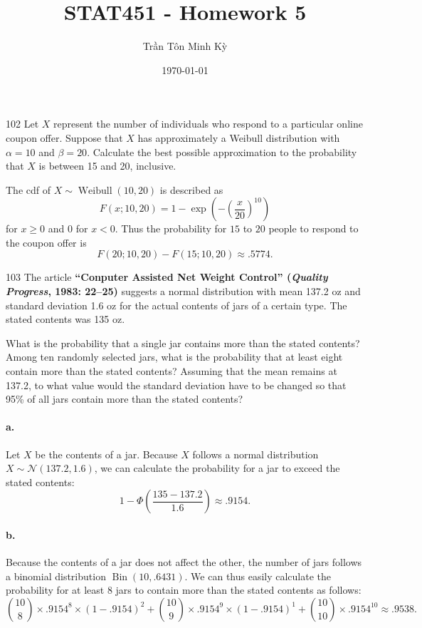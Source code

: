 \documentclass{exam}
\title{STAT451 - Homework 5}
\author{\foreignlanguage{vietnamese}{Trần Tôn Minh Kỳ}}
\date{\today}
\newcommand{\paren}[1]{\left(#1\right)}
\DeclareMathOperator{\Bin}{Bin}
\DeclareMathOperator{\Weibull}{Weibull}
\begin{document}
\maketitle
\begin{problem}{102}
	Let $X$ represent the number of individuals who respond to a particular online coupon offer. Suppose that $X$ has approximately a Weibull distribution with $\alpha = 10$ and $\beta = 20$. Calculate the best possible approximation to the probability that $X$ is between 15 and 20, inclusive.
\end{problem}

The cdf of $X \sim \Weibull(10, 20)$ is described as
\[
	F(x; 10, 20) = 1 - \exp(-\paren{\frac{x}{20}}^{10})
\]
for $x \ge 0$ and $0$ for $x < 0$. Thus the probability for $15$ to $20$ people to respond to the coupon offer is
\[
	F(20; 10, 20) - F(15; 10, 20) \approx .5774.
\]

\begin{problem}{103}
	The article \textbf{``Conputer Assisted Net Weight Control'' (\textit{Quality Progress}, 1983: 22--25)} suggests a normal distribution with mean 137.2 oz and standard deviation 1.6 oz for the actual contents of jars of a certain type. The stated contents was 135 oz.
	\begin{tasks}[label=\textbf{\alph*.}]
		\task What is the probability that a single jar contains more than the stated contents?
		\task Among ten randomly selected jars, what is the probability that at least eight contain more than the stated contents?
		\task Assuming that the mean remains at 137.2, to what value would the standard deviation have to be changed so that 95\% of all jars contain more than the stated contents?
	\end{tasks}
\end{problem}

\paragraph{a.} Let $X$ be the contents of a jar. Because $X$ follows a normal distribution $X \sim \mathcal N(137.2, 1.6)$, we can calculate the probability for a jar to exceed the stated contents:
\[
	1 - \Phi\paren{\frac{135 - 137.2}{1.6}} \approx .9154.
\]

\paragraph{b.} Because the contents of a jar does not affect the other, the number of jars follows a binomial distribution $\Bin(10, .6431)$. We can thus easily calculate the probability for at least $8$ jars to contain more than the stated contents as follows:
\[
	\binom{10}{8} \times .9154^8 \times (1 - .9154)^2 + \binom{10}{9} \times .9154^9 \times (1 - .9154)^1 + \binom{10}{10} \times .9154^{10} \approx .9538.
\]
\end{document}
